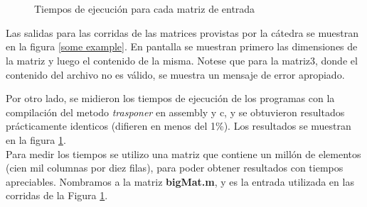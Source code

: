 \documentclass[11pt,a4paper]{article}
\begin{document}
\begin{figure}
\begin{center}
 \\
 \\
\end{center}
\caption{Tiempos de ejecuci\'on para cada matriz de entrada}
\label{some example 2}
\end{figure}

Las salidas para las corridas de las matrices provistas por la c\'atedra se muestran en la figura \ref{some example}. En pantalla se muestran primero las dimensiones de la matriz y luego el contenido de la misma. Notese que para la matriz3, donde el contenido del archivo no es v\'alido, se muestra un mensaje de error apropiado.

Por otro lado, se midieron los tiempos de ejecuci\'on de los programas con la compilaci\'on del metodo \textit{trasponer} en assembly y c, y se obtuvieron resultados pr\'acticamente identicos (difieren en menos del 1\%). Los resultados se muestran en la figura \ref{some example 2}.\\

Para medir los tiempos se utilizo una matriz que contiene un mill\'on de elementos (cien mil columnas por diez filas), para poder obtener resultados con tiempos apreciables. Nombramos a la matriz \textbf{bigMat.m}, y es la entrada utilizada en las corridas de la Figura \ref{some example 2}.
\end{document}
